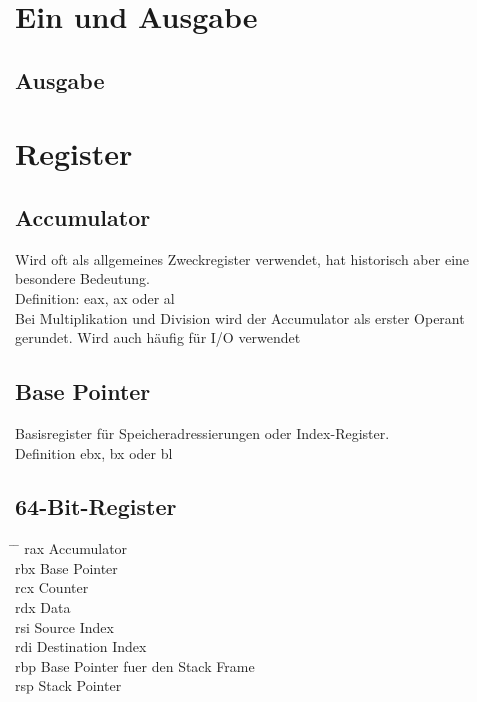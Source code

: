 \documentclass[a4paper,12pt,twoside]{article}
\begin{document}
\section{Ein und Ausgabe}
\subsection{Ausgabe}
\section{Register}
\subsection{Accumulator}
Wird oft als allgemeines Zweckregister verwendet, hat historisch aber eine \\ 
besondere Bedeutung. \\ 
Definition: eax, ax oder al \\ 
Bei Multiplikation und Division wird der Accumulator als erster Operant gerundet. 
Wird auch häufig für I/O verwendet \\ 
\subsection{Base Pointer}
Basisregister für Speicheradressierungen oder Index-Register. \\ 
Definition ebx, bx oder bl \\
\subsection{64-Bit-Register}
\begin{tabbing}
  \hspace{2mm} \= \hspace{50mm} \= \kill 
  \> rax \> Accumulator \\ 
  \> rbx \> Base Pointer \\ 
  \> rcx \> Counter \\ 
  \> rdx \> Data \\ 
  \> rsi \> Source Index \\ 
  \> rdi \> Destination Index \\ 
  \> rbp \> Base Pointer fuer den Stack Frame \\ 
  \> rsp \> Stack Pointer \\
\end{tabbing}
\end{document}
